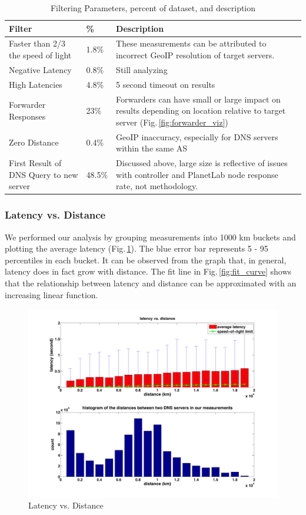 \begin{table}[!htb]
  \begin{tabular}{p{2.3cm} | p{.6cm} | p{4.6cm}}
    \hline
    Filter & \% & Description \\
    \hline
    Faster than 2/3 the speed of light & 1.8\% & These measurements can be attributed to incorrect GeoIP resolution of target servers. \\
	\hline
	Negative Latency & 0.8\% & Still analyzing \\
	\hline
	High Latencies & 4.8\% & 5 second timeout on results \\
	\hline
	Forwarder Responses & 23\% & Forwarders can have small or large impact on results depending on location relative to target server (Fig.\,\ref{fig:forwarder_viz}) \\
	\hline
	Zero Distance & 0.4\% & GeoIP inaccuracy, especially for DNS servers within the same AS \\
	\hline
	First Result of DNS Query to new server & 48.5\% & Discussed above, large size is reflective of issues with controller and PlanetLab node response rate, not methodology. \\
    \hline
  \end{tabular}
  \caption{Filtering Parameters, percent of dataset, and description}
  \label{tab:filter}
\end{table}

\subsubsection{Latency vs. Distance}
We performed our analysis by grouping measurements into 1000 km buckets and plotting the average latency (Fig.\,\ref{fig:latency_dist}). The blue error bar represents 5 - 95 percentiles in each bucket. It can be observed from the graph that, in general, latency does in fact grow with distance. The fit line in Fig.\,\ref{fig:fit_curve} shows that the relationship between latency and distance can be approximated with an increasing linear function.

\begin{figure}
  \centering
  \includegraphics[width=\linewidth]{../figs/King_latency_dist.pdf}
  \caption{Latency vs. Distance}
  \label{fig:latency_dist}
\end{figure}

